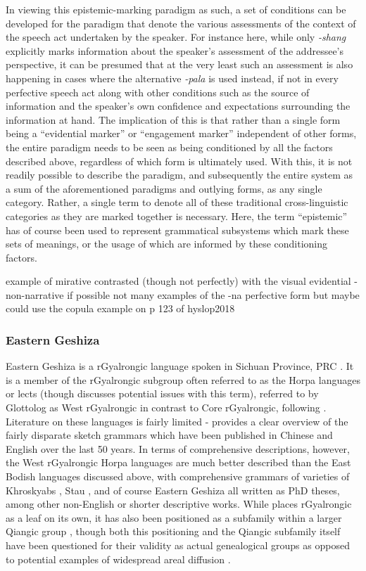 In viewing this epistemic-marking paradigm as such, a set of conditions can be developed for the paradigm that denote the various assessments of the context of the speech act undertaken by the speaker. For instance here, while only \textit{-shang} explicitly marks information about the speaker's assessment of the addressee's perspective, it can be presumed that at the very least such an assessment is also happening in cases where the alternative \textit{-pala} is used instead, if not in every perfective speech act along with other conditions such as the source of information and the speaker's own confidence and expectations surrounding the information at hand. The implication of this is that rather than a single form being a ``evidential marker'' or ``engagement marker'' independent of other forms, the entire paradigm needs to be seen as being conditioned by all the factors described above, regardless of which form is ultimately used. With this, it is not readily possible to describe the paradigm, and subsequently the entire system as a sum of the aforementioned paradigms and outlying forms, as any single category. Rather, a single term to denote all of these traditional cross-linguistic categories as they are marked together is necessary. Here, the term ``epistemic'' has of course been used to represent grammatical subsystems which mark these sets of meanings, or the usage of which are informed by these conditioning factors.


example of mirative contrasted (though not perfectly) with the visual evidential - non-narrative if possible
not many examples of the -na perfective form but maybe could use the copula example on p 123 of hyslop2018


\subsubsection{Eastern Geshiza}
Eastern Geshiza is a rGyalrongic language spoken in Sichuan Province, PRC \cite{Honkasalo2019}. It is a member of the rGyalrongic subgroup often referred to as the Horpa languages or lects (though  discusses potential issues with this term), referred to by Glottolog \cite{glottolog} as West rGyalrongic in contrast to Core rGyalrongic, following \cite{Gates2012}. Literature on these languages is fairly limited -  provides a clear overview of the fairly disparate sketch grammars which have been published in Chinese and English over the last 50 years. In terms of comprehensive descriptions, however, the West rGyalrongic Horpa languages are much better described than the East Bodish languages discussed above, with comprehensive grammars of varieties of Khroskyabs \cite{Lai2017}, Stau \cites{Gates2021}{Tunzhi2019}, and of course Eastern Geshiza \cite{Honkasalo2019} all written as PhD theses, among other non-English or shorter descriptive works. While  places rGyalrongic as a leaf on its own, it has also been positioned as a subfamily within a larger Qiangic group \cite[15]{Honkasalo2019}, though both this positioning and the Qiangic subfamily itself have been questioned for their validity as actual genealogical groups as opposed to potential examples of widespread areal diffusion \cites{Honkasalo2019}{Chirkova2012}.

